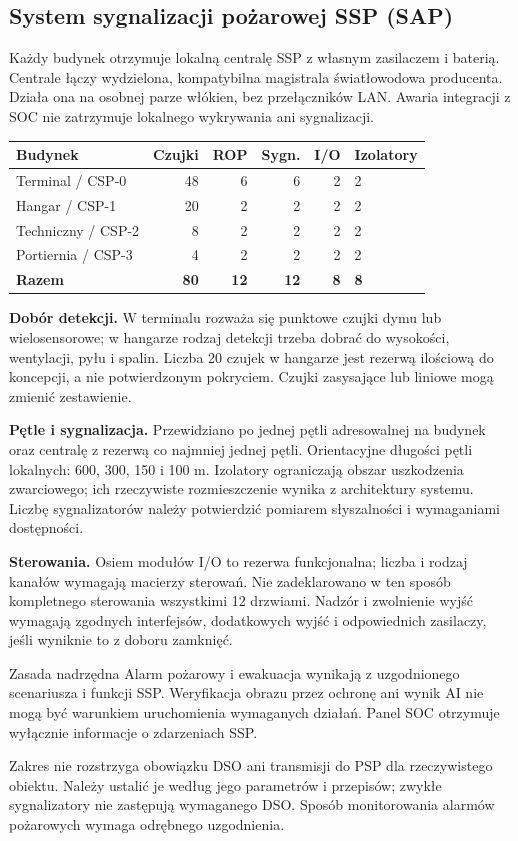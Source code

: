 \subsection{System sygnalizacji pożarowej SSP (SAP)}
Każdy budynek otrzymuje lokalną centralę SSP z własnym zasilaczem i baterią. Centrale łączy wydzielona, kompatybilna magistrala światłowodowa producenta. Działa ona na osobnej parze włókien, bez przełączników LAN. Awaria integracji z SOC nie zatrzymuje lokalnego wykrywania ani sygnalizacji.

\begin{tabularx}{\linewidth}{@{}P{35mm}rrrrY@{}}
\toprule\textbf{Budynek} & \textbf{Czujki} & \textbf{ROP} & \textbf{Sygn.} & \textbf{I/O} & \textbf{Izolatory}\\\midrule
Terminal / CSP-0 & 48 & 6 & 6 & 2 & 2\\
Hangar / CSP-1 & 20 & 2 & 2 & 2 & 2\\
Techniczny / CSP-2 & 8 & 2 & 2 & 2 & 2\\
Portiernia / CSP-3 & 4 & 2 & 2 & 2 & 2\\\midrule
\textbf{Razem} & \textbf{80} & \textbf{12} & \textbf{12} & \textbf{8} & \textbf{8}\\\bottomrule
\end{tabularx}

\textbf{Dobór detekcji.} W terminalu rozważa się punktowe czujki dymu lub wielosensorowe; w hangarze rodzaj detekcji trzeba dobrać do wysokości, wentylacji, pyłu i spalin. Liczba 20 czujek w hangarze jest rezerwą ilościową do koncepcji, a nie potwierdzonym pokryciem. Czujki zasysające lub liniowe mogą zmienić zestawienie.

\textbf{Pętle i sygnalizacja.} Przewidziano po jednej pętli adresowalnej na budynek oraz centralę z rezerwą co najmniej jednej pętli. Orientacyjne długości pętli lokalnych: 600, 300, 150 i 100 m. Izolatory ograniczają obszar uszkodzenia zwarciowego; ich rzeczywiste rozmieszczenie wynika z architektury systemu. Liczbę sygnalizatorów należy potwierdzić pomiarem słyszalności i wymaganiami dostępności.

\textbf{Sterowania.} Osiem modułów I/O to rezerwa funkcjonalna; liczba i rodzaj kanałów wymagają macierzy sterowań. Nie zadeklarowano w ten sposób kompletnego sterowania wszystkimi 12 drzwiami. Nadzór i zwolnienie wyjść wymagają zgodnych interfejsów, dodatkowych wyjść i odpowiednich zasilaczy, jeśli wyniknie to z doboru zamknięć.

\begin{note}{Zasada nadrzędna}
Alarm pożarowy i ewakuacja wynikają z uzgodnionego scenariusza i funkcji SSP. Weryfikacja obrazu przez ochronę ani wynik AI nie mogą być warunkiem uruchomienia wymaganych działań. Panel SOC otrzymuje wyłącznie informacje o zdarzeniach SSP.
\end{note}
Zakres nie rozstrzyga obowiązku DSO ani transmisji do PSP dla rzeczywistego obiektu. Należy ustalić je według jego parametrów i przepisów; zwykłe sygnalizatory nie zastępują wymaganego DSO. Sposób monitorowania alarmów pożarowych wymaga odrębnego uzgodnienia.
